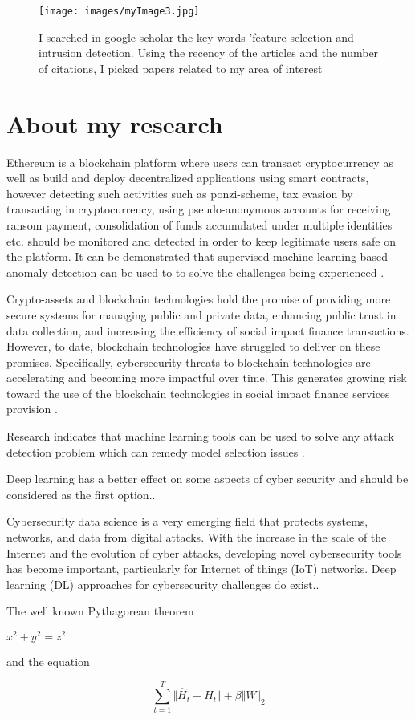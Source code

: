 \documentclass{article}
\begin{document}
\begin{figure}[H]
 \centering
  \texttt{[image: images/myImage3.jpg]}
 \caption{I searched in google scholar the key words 'feature selection and intrusion detection. Using the recency of the articles and the number of citations, I picked papers related to my area of interest}
 \label{fig:2}
\end{figure}

\section{About my research}

Ethereum is a blockchain platform where users can transact cryptocurrency as well as build and deploy decentralized applications using smart contracts, however detecting such activities such as ponzi-scheme, tax evasion by transacting in cryptocurrency, using pseudo-anonymous accounts for receiving ransom payment, consolidation of funds accumulated under multiple identities etc. should be monitored and detected in order to keep legitimate users safe on the platform. It can be demonstrated that supervised machine learning based anomaly detection can be used to to solve the challenges being experienced \cite{kumar2020detecting}.

Crypto-assets and blockchain technologies hold the promise of providing more secure systems for managing public and private data, enhancing public trust in data collection, and increasing the efficiency of social impact finance transactions. However, to date, blockchain technologies have struggled to deliver on these promises. Specifically, cybersecurity threats to blockchain technologies are accelerating and becoming more impactful over time. This generates growing risk toward the use of the blockchain technologies in social impact finance services provision \cite{gurdgiev2021informational}.

Research indicates that machine learning tools can be used to solve any attack detection problem which can remedy model selection issues \cite{berghout2022machine}.

Deep learning has a better effect on some aspects of cyber security and should be considered as the first option.\cite{li2021deep}.

Cybersecurity data science is a very emerging field that protects systems, networks, and data from digital attacks. With the increase in the scale of the Internet and the evolution of cyber attacks, developing novel cybersecurity tools has become important, particularly for Internet of things (IoT) networks. Deep learning (DL) approaches for cybersecurity challenges do exist.\cite{podder2021artificial}.
\par
 \doublespacing
The well known Pythagorean theorem \par \(x^2 + y^2 = z^2\) \par and the equation \par
 \doublespacing
\begin{equation*} \sum _{t=1}^{T}\Vert {\hat{H}_t-H_t}\Vert +\beta \Vert W\Vert _2 \tag{11} \end{equation*}
\end{document}
